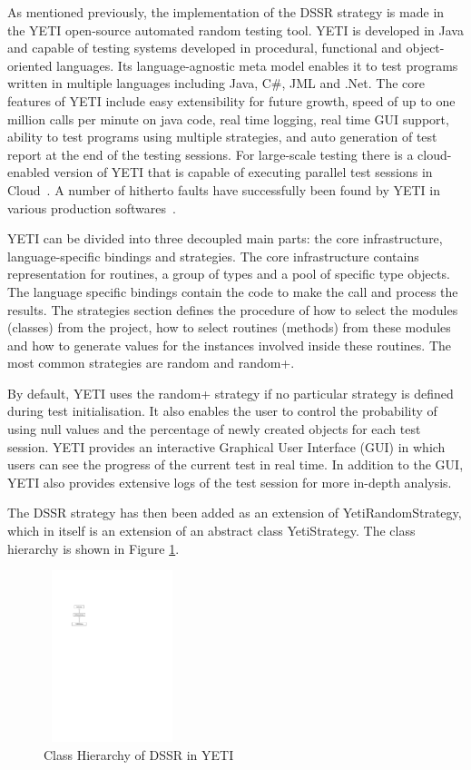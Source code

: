 \documentclass{acm_proc_article-sp}
\begin{document}
As mentioned previously, the implementation of the DSSR strategy is made in the YETI open-source automated random testing tool. YETI is developed in Java and capable of testing systems developed in procedural, functional and object-oriented languages. Its language-agnostic meta model enables it to test programs written in multiple languages including Java, C\#, JML and .Net. The core features of YETI include easy extensibility for future growth, speed of up to one million calls per minute on java code, real time logging, real time GUI support, ability to test programs using multiple strategies, and auto generation of test report at the end of the testing sessions. For large-scale testing there is a cloud-enabled version of YETI that is capable of executing parallel test sessions in Cloud~\cite{Oriol2010}. A number of hitherto faults have successfully been found by YETI in various production softwares~\cite{Oriol2012, Oriol2011}.

YETI can be divided into three decoupled main parts: the core infrastructure, language-specific bindings and strategies. The core infrastructure contains representation for routines, a group of types and a pool of specific type objects. The language specific bindings contain the code to make the call and process the results. The strategies section defines the procedure of how to select the modules (classes) from the project, how to select routines (methods) from these modules and how to generate values for the instances involved inside these routines. The most common strategies are random and random+. 

By default, YETI uses the random+ strategy if no particular strategy is defined during test initialisation. It also enables the user to control the probability of using null values and the percentage of newly created objects for each test session. YETI provides an interactive Graphical User Interface (GUI) in which users can see the progress of the current test in real time. In addition to the GUI, YETI also provides extensive logs of the test session for more in-depth analysis.

The DSSR strategy has then been added as an extension of YetiRandomStrategy, which in itself is an extension of an abstract class YetiStrategy. The class hierarchy is shown in Figure \ref{fig:hierarchyofDSSR}.

\begin{figure}[h]
\centering
\includegraphics[width=4cm,height=5cm]{hierarchy.pdf}
\caption{Class Hierarchy of DSSR in YETI}
\label{fig:hierarchyofDSSR}
\end{figure}
\end{document}

